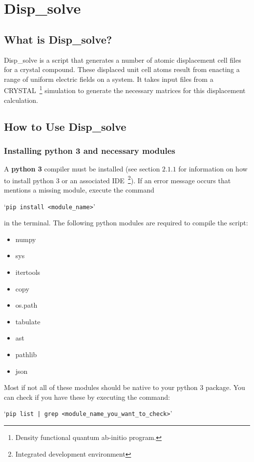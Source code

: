 \section{Disp\_solve}
\subsection{What is Disp\_solve?}
Disp\_solve is a script that generates a number of atomic displacement cell
files for a crystal compound. These displaced unit cell atoms result from
enacting a range of uniform electric fields on a system. It takes input files
from a CRYSTAL~\footnote{Density functional quantum ab-initio program.}
simulation to generate the necessary matrices for this displacement
calculation.

\subsection{How to Use Disp\_solve}
\subsubsection{Installing python 3 and necessary modules}
A \textbf{python 3} compiler must be installed (see section $2.1.1$ for
information on how to install python 3 or an associated IDE~\footnote{Integrated development environment}). If an error message occurs that
mentions a missing module, execute the command

`\texttt{pip install <module\_name>}'

in the terminal. The following python modules are required to compile
the script:
  \begin{itemize} \itemsep -0.5ex
 	\item numpy
 	\item sys
 	\item itertools
 	\item copy
 	\item os.path
 	\item tabulate
 	\item ast
 	\item pathlib
 	\item json
 \end{itemize}

Most if not all of these modules should be native to your python 3 package. You can check if you have these by executing the command:

`\texttt{pip list | grep <module\_name\_you\_want\_to\_check>}'

